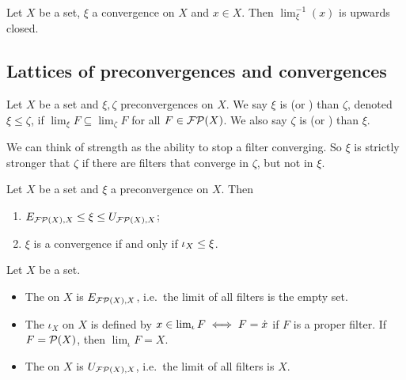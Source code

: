 \begin{lemma}
Let $X$ be a set, $\xi$ a convergence on $X$ and $x\in X$. Then $\lim_\xi^{-1}(x)$ is upwards closed.
\end{lemma}

\subsection{Lattices of preconvergences and convergences}
\begin{definition}
Let $X$ be a set and $\xi,\zeta$ preconvergences on $X$. We say $\xi$ is  (or ) than $\zeta$, denoted $\xi \leq \zeta$, if $\lim_\xi F \subseteq \lim_\zeta F$ for all $F\in\operatorname{\mathcal{FP}}(X)$. We also say $\zeta$ is  (or ) than $\xi$.
\end{definition}
We can think of strength as the ability to stop a filter converging. So $\xi$ is strictly stronger that $\zeta$ if there are filters that converge in $\zeta$, but not in $\xi$. 

\begin{lemma}
Let $X$ be a set and $\xi$ a preconvergence on $X$. Then
\begin{enumerate}
\item $E_{\operatorname{\mathcal{FP}}(X), X} \leq \xi \leq U_{\operatorname{\mathcal{FP}}(X), X}$;
\item $\xi$ is a convergence \textup{if and only if} $\operatorname{\iota}_X \leq \xi$.
\end{enumerate}
\end{lemma}

\begin{definition}
Let $X$ be a set.
\begin{itemize}
\item The  on $X$ is $E_{\operatorname{\mathcal{FP}}(X), X}$, i.e.\ the limit of all filters is the empty set.
\item The  $\iota_X$ on $X$ is defined by $x \in \lim_\iota F \iff F = \dot{x}$ if $F$ is a proper filter. If $F = \operatorname{\mathcal{P}}(X)$, then $\lim_\iota F = X$.
\item The  on $X$ is $U_{\operatorname{\mathcal{FP}}(X), X}$, i.e.\ the limit of all filters is $X$.
\end{itemize}
\end{definition}

